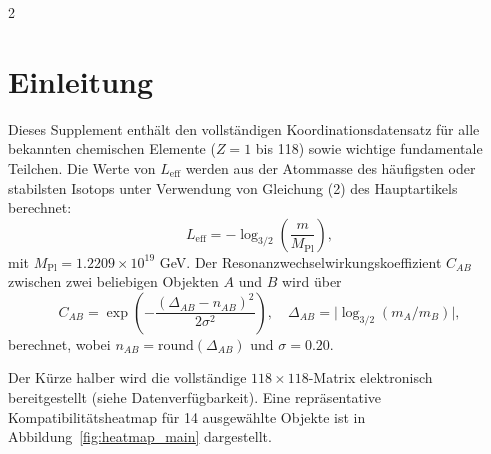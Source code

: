 \documentclass[11pt,a4paper]{article}
\begin{document}
	\begin{multicols}{2}
		\section*{Einleitung}
		Dieses Supplement enthält den vollständigen Koordinationsdatensatz für alle bekannten chemischen Elemente (\(Z = 1\) bis 118) sowie wichtige fundamentale Teilchen. Die Werte von \(L_{\mathrm{eff}}\) werden aus der Atommasse des häufigsten oder stabilsten Isotops unter Verwendung von Gleichung (2) des Hauptartikels berechnet:
		\[
		L_{\mathrm{eff}} = -\log_{3/2}\!\left( \frac{m}{M_{\mathrm{Pl}}} \right),
		\]
		mit \(M_{\mathrm{Pl}} = 1.2209\times 10^{19}\) GeV. Der Resonanzwechselwirkungskoeffizient \(C_{AB}\) zwischen zwei beliebigen Objekten \(A\) und \(B\) wird über
		\[
		C_{AB} = \exp\!\left( - \frac{(\Delta_{AB} - n_{AB})^2}{2\sigma^2} \right),\quad
		\Delta_{AB} = \bigl|\log_{3/2}(m_A/m_B)\bigr|,
		\]
		berechnet, wobei \(n_{AB} = \text{round}(\Delta_{AB})\) und \(\sigma = 0.20\).
		
		Der Kürze halber wird die vollständige \(118\times118\)-Matrix elektronisch bereitgestellt (siehe Datenverfügbarkeit). Eine repräsentative Kompatibilitätsheatmap für 14 ausgewählte Objekte ist in Abbildung~\ref{fig:heatmap_main} dargestellt.
	\end{multicols}
	
\end{document}
